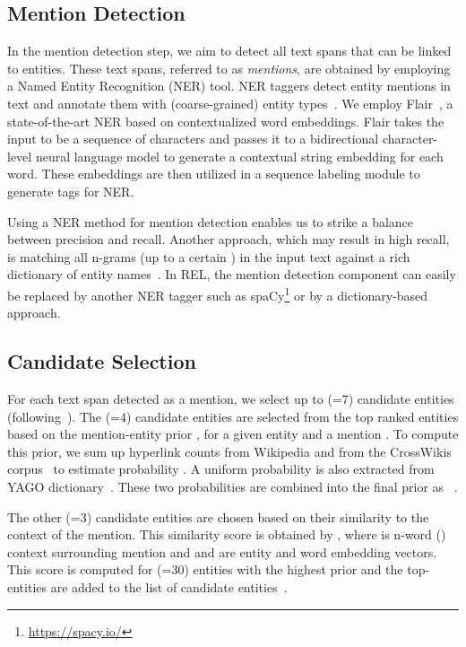 \documentclass[sigconf]{acmart}
\newcommand{\miniskip}{\vspace*{-.5\baselineskip}}
\begin{document}
\miniskip
\subsection{Mention Detection}
\label{sec:approach:md} 
In the mention detection step, we aim to detect all text spans that can be linked to entities. These text spans, referred to as \emph{mentions}, are obtained by employing a Named Entity Recognition (NER) tool. NER taggers detect entity mentions in text and annotate them with (coarse-grained) entity types~\cite{Balog:2018:EOS}.  We employ Flair~\cite{Akbik:2018:flair}, a state-of-the-art NER based on contextualized word embeddings.  Flair takes the input to be a sequence of characters and passes it to a bidirectional character-level neural language model to generate a contextual string embedding for each word.  These embeddings are then utilized in a sequence labeling module to generate tags for NER.
 
Using a NER method for mention detection enables us to strike a balance between precision and recall. Another approach, which may result in high recall,
is matching all n-grams (up to a certain ) in the input text against a rich dictionary of entity names~\cite{Hasibi:2015:ELQ,Balog:2018:EOS}.  In REL, the mention detection component can easily be replaced by another NER tagger such as spaCy\footnote{\url{https://spacy.io/}} or by a dictionary-based approach. 

 \miniskip
 \subsection{Candidate Selection}
 \label{sec:approach:cs} 
 For each text span detected as a mention, we select up to  (=7) candidate entities (following~\cite{Ganea:2017:DJE}). The  (=4) candidate entities are selected from the top ranked entities based on the mention-entity prior , for a given entity  and a mention . To compute this prior, we sum up hyperlink counts from Wikipedia and from the CrossWikis corpus~\cite{Spitkovsky:2012:CDE} to estimate probability . A uniform probability  is also extracted from YAGO dictionary~\cite{Hoffart:2011:RDN}. These two probabilities are combined into the final  prior as ~\cite{Ganea:2017:DJE}.
 
 The other  (=3) candidate entities are chosen based on their similarity to the context of the mention. This similarity score is obtained by , where  is n-word () context surrounding mention  and  and  are entity and word embedding vectors. This score is computed for  (=30) entities with the highest  prior and the top- entities are added to the list of candidate entities~\cite{Ganea:2017:DJE}.
\end{document}
